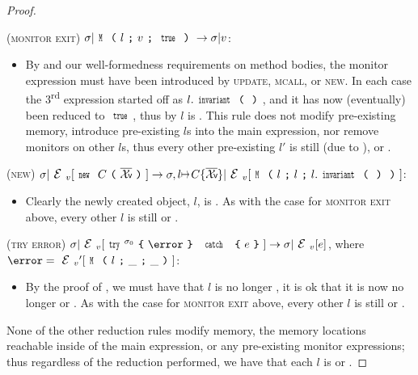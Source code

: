 \begin{proof}
\begin{ienumerate}
	\item (\textsc{monitor exit}) $\s|\M{l}{v}{\Kw{true}}\rightarrow \s|v$:
	\begin{itemize}
	\item[] By \VS and our well-formedness requirements on method bodies, the monitor expression must have been introduced by \textsc{update}, \textsc{mcall}, or \textsc{new}. In each case the 3\textsuperscript{rd} expression started off as $l.\invariant$, and it has now (eventually) been reduced to $\Kw{true}$, thus by  $l$ is \valid. This rule does not modify pre-existing memory, introduce pre-existing $l$s into the main expression, nor remove monitors on other $l$s, thus every other pre-existing $l'$ is still \valid (due to ), or \mony.
	\end{itemize}

		\item (\textsc{new}) $\s|\EV[\Kw{new}\ C\oR\vs\cR]\rightarrow \s,l\mapsto C\{\vs\}|\EV[ \M{l}{l}{l.\invariant}]$:
		\begin{itemize}
			\item[] Clearly the newly created object, $l$, is \mony. As with the case for \textsc{monitor exit} above, every other \reach $l$ is still \valid or \mony.
		\end{itemize}
			
		\item (\textsc{try error}) $\s|\EV[\Kw{try}^{\s_0}\oC \error\cC\ \Kw{catch}\ \oC e\cC] \rightarrow \s|\EV[e]$, where $\error = \EV'[\M{l}{\_}{\_}]$:
		\begin{itemize}
			\item[] By the proof of , we must have that $l$ is no longer \reach, it is ok that it is now no longer \valid or \mony. As with the case for \textsc{monitor exit} above, every other \reach $l$ is still \valid or \mony.
		\end{itemize}
\end{ienumerate}

\noindent None of the other reduction rules modify memory, the memory locations reachable inside of the main expression, or any pre-existing monitor expressions; thus regardless of the reduction performed, we have that each \reach $l$ is \valid or \mony.
\end{proof}

